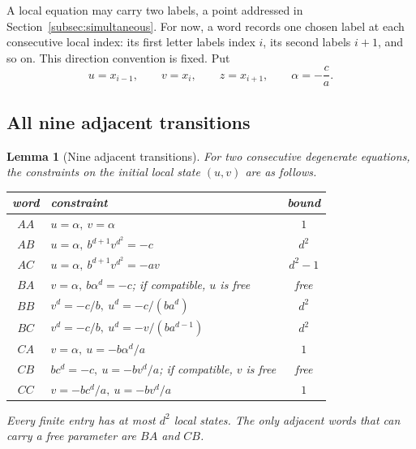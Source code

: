 \documentclass[11pt]{article}
\newtheorem{lemma}[theorem]{Lemma}
\theoremstyle{definition}
\theoremstyle{remark}
\begin{document}
A local equation may carry two labels, a point addressed in
Section~\ref{subsec:simultaneous}.  For now, a word records one chosen label
at each consecutive local index: its first letter labels index \(i\), its
second labels \(i+1\), and so on.  This direction convention is fixed.  Put
\[
 u=x_{i-1},\qquad v=x_i,\qquad z=x_{i+1},\qquad
 \alpha=-\frac ca.
\]

\subsection{All nine adjacent transitions}

\begin{lemma}[Nine adjacent transitions]\label{lem:nine}
For two consecutive degenerate equations, the constraints on the initial
local state \((u,v)\) are as follows.
\begin{center}
\begin{tabular}{c@{\qquad}p{8.2cm}@{\qquad}c}
\toprule
word & constraint & bound\\
\midrule
\(AA\) & \(u=\alpha,\ v=\alpha\) & \(1\)\\
\(AB\) & \(u=\alpha,\ b^{d+1}v^{d^2}=-c\) & \(d^2\)\\
\(AC\) & \(u=\alpha,\ b^{d+1}v^{d^2}=-av\) & \(d^2-1\)\\
\(BA\) & \(v=\alpha,\ b\alpha^d=-c\); if compatible, \(u\) is free & free\\
\(BB\) & \(v^d=-c/b,\ u^d=-c/(ba^d)\) & \(d^2\)\\
\(BC\) & \(v^d=-c/b,\ u^d=-v/(ba^{d-1})\) & \(d^2\)\\
\(CA\) & \(v=\alpha,\ u=-b\alpha^d/a\) & \(1\)\\
\(CB\) & \(bc^d=-c,\ u=-bv^d/a\); if compatible, \(v\) is free & free\\
\(CC\) & \(v=-bc^d/a,\ u=-bv^d/a\) & \(1\)\\
\bottomrule
\end{tabular}
\end{center}
Every finite entry has at most \(d^2\) local states.  The only adjacent
words that can carry a free parameter are \(BA\) and \(CB\).
\end{lemma}
\end{document}
